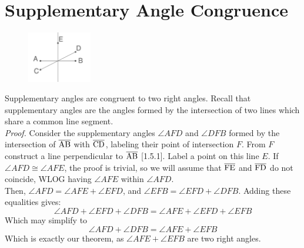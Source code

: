 \documentclass{report}
\begin{document}
\section{Supplementary Angle Congruence}
\begin{figure} %
    \centering
    \includegraphics[width=0.25\textwidth]{supp}
\end{figure}
Supplementary angles are congruent to two right angles. Recall that supplementary angles are the angles formed by the intersection of two lines which share a common line segment.
\\[\baselineskip]
\textit{Proof.} Consider the supplementary angles $\angle AFD$ and $\angle DFB$ formed by the intersection of $\overline{\rm AB}$ with $\overline{\rm CD}$, labeling their point of intersection $F$. From $F$ construct a line perpendicular to $\overline{\rm AB}$ [1.5.1]. Label a point on this line $E$. If $\angle AFD \cong \angle AFE$, the proof is trivial, so we will assume that $\overline{\rm FE}$ and $\overline{\rm FD}$ do not coincide, WLOG having $\angle AFE$ within $\angle AFD$.
\\Then, $\angle AFD = \angle AFE + \angle EFD$, and $\angle EFB = \angle EFD + \angle DFB$. Adding these equalities gives: \begin{displaymath}
\angle AFD + \angle EFD + \angle DFB = \angle AFE + \angle EFD + \angle EFB
\end{displaymath}
Which may simplify to\begin{displaymath}
\angle AFD +\angle DFB = \angle AFE + \angle EFB
\end{displaymath}
Which is exactly our theorem, as  $\angle AFE + \angle EFB$ are two right angles.
\end{document}
